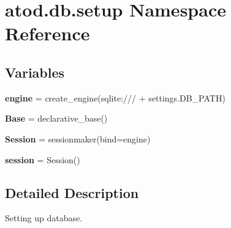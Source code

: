 \hypertarget{namespaceatod_1_1db_1_1setup}{}\section{atod.\+db.\+setup Namespace Reference}
\label{namespaceatod_1_1db_1_1setup}
\subsection*{Variables}
\begin{DoxyCompactItemize}
\item 
{\bfseries engine} = create\+\_\+engine(\textquotesingle{}sqlite\+:///\textquotesingle{} + settings.\+D\+B\+\_\+\+P\+A\+TH)\hypertarget{namespaceatod_1_1db_1_1setup_a5339d3ba73c5603c6683ef6097ff2f75}{}\label{namespaceatod_1_1db_1_1setup_a5339d3ba73c5603c6683ef6097ff2f75}

\item 
{\bfseries Base} = declarative\+\_\+base()\hypertarget{namespaceatod_1_1db_1_1setup_a16d34167d9d279b13228df8d9a54616b}{}\label{namespaceatod_1_1db_1_1setup_a16d34167d9d279b13228df8d9a54616b}

\item 
{\bfseries Session} = sessionmaker(bind=engine)\hypertarget{namespaceatod_1_1db_1_1setup_a5d0e717678c8672f26543f30d5c3863b}{}\label{namespaceatod_1_1db_1_1setup_a5d0e717678c8672f26543f30d5c3863b}

\item 
{\bfseries session} = Session()\hypertarget{namespaceatod_1_1db_1_1setup_ad6cd914bec0c956246066261db62ef28}{}\label{namespaceatod_1_1db_1_1setup_ad6cd914bec0c956246066261db62ef28}

\end{DoxyCompactItemize}


\subsection{Detailed Description}
\begin{DoxyVerb}Setting up database. \end{DoxyVerb}
 